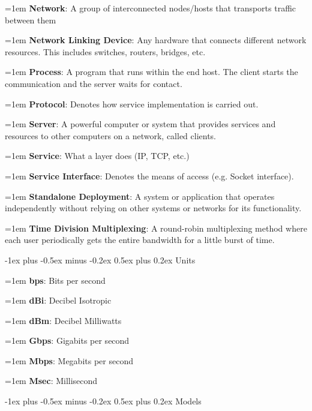 \documentclass[letterpaper,8pt]{extarticle}
\makeatletter
\newcommand{\definition}[2]{
  \hangindent=1em
  \textbf{#1}: #2%
}
\renewcommand{\section}{\@startsection{section}{1}{0mm}%
  {-1ex plus -0.5ex minus -0.2ex}%
  {0.5ex plus 0.2ex}%
{\color{h1} \normalfont\small\bfseries}}
\makeatother
\begin{document}
\begin{multicols*}{5}
  \definition{Network}{A group of interconnected nodes/hosts that transports traffic between them}

  \definition{Network Linking Device}{Any hardware that connects different network resources. This includes switches, routers, bridges, etc.}

  \definition{Process}{A program that runs within the end host. The client starts the communication and the server waits for contact.}

  \definition{Protocol}{Denotes how service implementation is carried out.}

  \definition{Server}{A powerful computer or system that provides services and resources to other computers on a network, called clients.}

  \definition{Service}{What a layer does (IP, TCP, etc.)}

  \definition{Service Interface}{Denotes the means of access (e.g. Socket interface).}

  \definition{Standalone Deployment}{A system or application that operates independently without relying on other systems or networks for its functionality.}

  \definition{Time Division Multiplexing}{A round-robin multiplexing method where each user periodically gets the entire bandwidth for a little burst of time.}

  \section{Units}

  \begin{multicols*}{2}

    \definition{bps}{Bits per second}

    \definition{dBi}{Decibel Isotropic}

    \definition{dBm}{Decibel Milliwatts}

    \definition{Gbps}{Gigabits per second}

    \definition{Mbps}{Megabits per second}

    \definition{Msec}{Millisecond}

  \end{multicols*}

  \section{Models}
  \begin{multicols*}{2}

\end{multicols*}
\end{multicols*}
\end{document}
